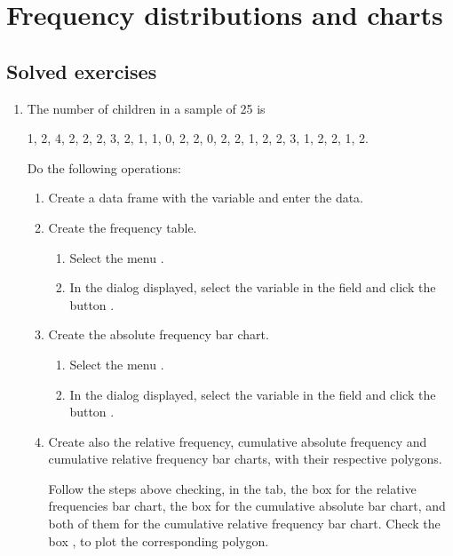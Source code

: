 
\chapter{Frequency distributions and charts}\label{cha:freqency-distributions}

\section{Solved exercises}
\begin{enumerate}[leftmargin=*]

\item The number of children in a sample of 25 is
\begin{center}
1, 2, 4, 2, 2, 2, 3, 2, 1, 1, 0, 2, 2, 0, 2, 2, 1, 2, 2, 3, 1, 2, 2, 1, 2.
\end{center}
Do the following operations:
\begin{enumerate}
\item Create a data frame with the variable  and enter the data.

\item Create the frequency table.
\begin{indication}
\begin{enumerate}
\item Select the menu  .
\item In the dialog displayed, select the variable  in the field  and
click the button .
\end{enumerate}
\end{indication}

\item Create the absolute frequency bar chart.
\begin{indication}
\begin{enumerate}
\item Select the menu .
\item In the dialog displayed, select the variable  in the field  and click
the button .
\end{enumerate}
\end{indication}

\item Create also the relative frequency, cumulative absolute frequency and cumulative relative frequency bar charts,
with their respective polygons.
\begin{indication}Follow the steps above checking, in the  tab, the box
 for the relative frequencies bar chart, the box  for the cumulative absolute bar chart, and both of them for the cumulative relative frequency bar chart. 
Check the box , to plot the corresponding polygon. 
\end{indication}
\end{enumerate}


\end{enumerate}
